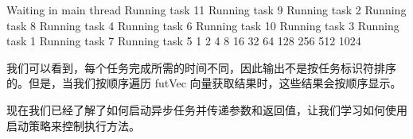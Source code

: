 \begin{shell}
Waiting in main thread
Running task 11
Running task 9
Running task 2
Running task 8
Running task 4
Running task 6
Running task 10
Running task 3
Running task 1
Running task 7
Running task 5
1 2 4 8 16 32 64 128 256 512 1024
\end{shell}

我们可以看到，每个任务完成所需的时间不同，因此输出不是按任务标识符排序的。但是，当我们按顺序遍历 futVec 向量获取结果时，这些结果会按顺序显示。

现在我们已经了解了如何启动异步任务并传递参数和返回值，让我们学习如何使用启动策略来控制执行方法。



























